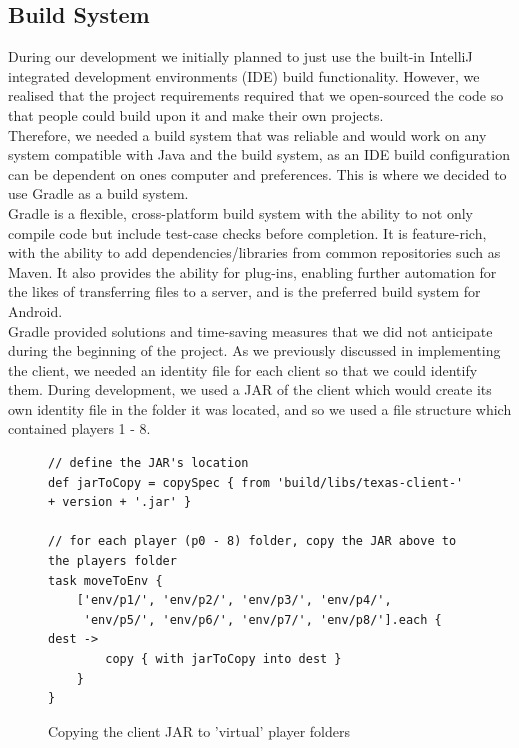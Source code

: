\documentclass[11pt]{article}
\begin{document}
\newpage

\subsection{Build System}
During our development we initially planned to just use the built-in IntelliJ integrated development environments (IDE) build functionality. However, we realised that the project requirements required that we open-sourced the code so that people could build upon it and make their own projects. \\

Therefore, we needed a build system that was reliable and would work on any system compatible with Java and the build system, as an IDE build configuration can be dependent on ones computer and preferences. This is where we decided to use Gradle as a build system. \\

Gradle \citep{gradle} is a flexible, cross-platform build system with the ability to not only compile code but include test-case checks before completion. It is feature-rich, with the ability to add dependencies/libraries from common repositories such as Maven\citep{maven}. It also provides the ability for plug-ins, enabling further automation for the likes of transferring files to a server, and is the preferred build system for Android. \cite{android_gradle} \\

Gradle provided solutions and time-saving measures that we did not anticipate during the beginning of the project. As we previously discussed in implementing the client, we needed an identity file for each client so that we could identify them. During development, we used a JAR of the client which would create its own identity file in the folder it was located, and so we used a file structure which contained players 1 - 8. 


\begin{figure}[h]
\begin{lstlisting}[frame=single,framexleftmargin=10pt, framexrightmargin=15pt]
// define the JAR's location 
def jarToCopy = copySpec { from 'build/libs/texas-client-' + version + '.jar' }

// for each player (p0 - 8) folder, copy the JAR above to the players folder
task moveToEnv {
    ['env/p1/', 'env/p2/', 'env/p3/', 'env/p4/', 
     'env/p5/', 'env/p6/', 'env/p7/', 'env/p8/'].each { dest ->
        copy { with jarToCopy into dest }
    }
}
\end{lstlisting}
\caption{Copying the client JAR to 'virtual' player folders}
\end{figure}
\end{document}
